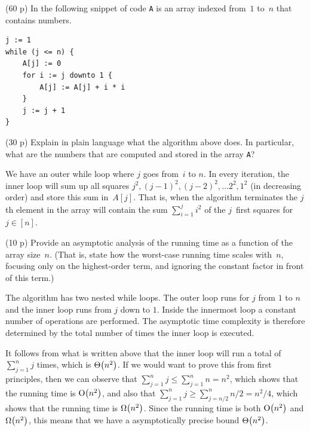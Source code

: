 \documentclass{jn-pset}
\begin{document}
\begin{problem}%
  \label{problem:code-snippet-1}%
  (60 p)
  In the following snippet of code \verb+A+ is an array
  indexed from~$1$ to~$n$ that
  contains numbers.
\begin{verbatim}
j := 1
while (j <= n) {
    A[j] := 0
    for i := j downto 1 {
        A[j] := A[j] + i * i
    }
    j := j + 1
}
\end{verbatim}

  \begin{subproblem}%
    {(30 p)}
    {\ignorespaces}
  Explain in plain language what the algorithm above does.
  In particular, what are the numbers that are computed and
  stored in the array \verb+A+?
\end{subproblem}

\begin{solution}
  We have an outer while loop where $j$ goes from~$i$ to $n$.
  In every iteration, the inner loop will sum up all squares
  $
  j^2, (j-1)^2, (j-2)^2, \ldots
  2^2, 1^2
  $
  (in decreasing order)
  and store this sum in~$A[j]$.
  That is,
  when the algorithm terminates
  the $j$th element in the array will contain the sum
  $
  \sum_{i=1}^{j} i^2
  $
  of the $j$~first squares for $j \in [n]$.
\end{solution}


\begin{subproblem}%
    {(10 p)}
    {\ignorespaces}
  Provide an asymptotic analysis of the running time
  as a function of the array size~$n$.
  (That is, state how the worst-case running time scales with~$n$,
  focusing only on the highest-order term, and ignoring the constant
  factor in front of this term.)
\end{subproblem}

\begin{solution}
  The algorithm has two nested while loops. 
  The outer loop runs for $j$ from $1$ to $n$
  and the inner loop runs from $j$ down to $1$.
  Inside the innermost loop a constant number of operations are performed.
  The asymptotic time complexity is therefore determined by the total
  number of times the inner loop is executed.

  It follows from what is written above that the inner loop will run a
  total of
  $
  \sum_{j=1}^{n} j
  $
  times, which is $\Theta \bigl( n^2 \bigr)$.
  If we would want to prove this from first principles, then we can observe that
  $
  \sum_{j=1}^{n} j
  \leq
  \sum_{j=1}^{n} n
  = n^2
  $,
  which shows that the running time is $\mathrm{O} \bigl( n^2 \bigr)$, 
  and also that 
  $
  \sum_{j=1}^{n} j
  \geq
  \sum_{j=n/2}^{n} n/2
  = n^2 / 4
  $,
  which shows that the running time is $\Omega \bigl( n^2 \bigr)$.
  Since the running time is both
  $\mathrm{O} \bigl( n^2 \bigr)$
  and
  $\Omega \bigl( n^2 \bigr)$,
  this means that we have a asymptotically precise bound
  $\Theta \bigl( n^2 \bigr)$.


\end{solution}
\end{problem}
\end{document}
